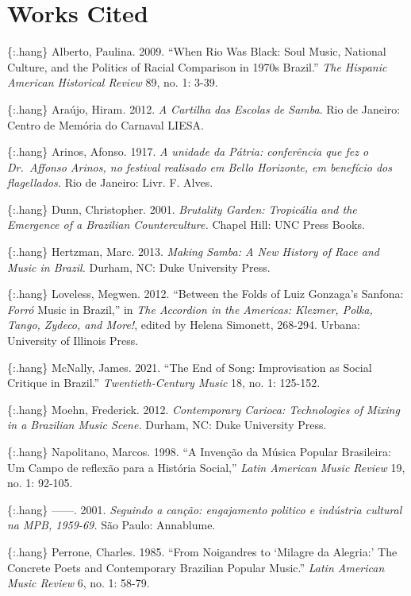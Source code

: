 \documentclass[twoside]{article}
\begin{document}
\hypertarget{works-cited}{%
\section*{Works Cited}\label{works-cited}}

\{:.hang\} Alberto, Paulina. 2009. ``When Rio Was Black: Soul Music,
National Culture, and the Politics of Racial Comparison in 1970s
Brazil.'' \emph{The Hispanic American Historical Review} 89, no. 1:
3-39.

\{:.hang\} Araújo, Hiram\emph{.} 2012. \emph{A Cartilha das Escolas de
Samba}. Rio de Janeiro: Centro de Memória do Carnaval LIESA.

\{:.hang\} Arinos, Afonso. 1917. \emph{A unidade da Pátria: conferência
que fez o Dr.~Affonso Arinos, no festival realisado em Bello Horizonte,
em benefício dos flagellados.} Rio de Janeiro: Livr. F. Alves.

\{:.hang\} Dunn, Christopher. 2001. \emph{Brutality Garden: Tropicália
and the Emergence of a Brazilian Counterculture.} Chapel Hill: UNC Press
Books.

\{:.hang\} Hertzman, Marc. 2013. \emph{Making Samba: A New History of
Race and Music in Brazil.} Durham, NC: Duke University Press.

\{:.hang\} Loveless, Megwen. 2012. ``Between the Folds of Luiz Gonzaga's
Sanfona: \emph{Forró} Music in Brazil,'' in \emph{The Accordion in the
Americas: Klezmer, Polka, Tango, Zydeco, and More!}, edited by Helena
Simonett, 268-294. Urbana: University of Illinois Press.

\{:.hang\} McNally, James. 2021. ``The End of Song: Improvisation as
Social Critique in Brazil.'' \emph{Twentieth-Century Music} 18, no. 1:
125-152.

\{:.hang\} Moehn, Frederick. 2012. \emph{Contemporary Carioca:
Technologies of Mixing in a Brazilian Music Scene.} Durham, NC: Duke
University Press.

\{:.hang\} Napolitano, Marcos. 1998. ``A Invenção da Música Popular
Brasileira: Um Campo de reflexão para a História Social,'' \emph{Latin
American Music Review} 19, no. 1: 92-105.

\{:.hang\} ­­­------. 2001. \emph{Seguindo a canção: engajamento
politico e indústria cultural na MPB, 1959-69.} São Paulo: Annablume.

\{:.hang\} Perrone, Charles. 1985. ``From Noigandres to `Milagre da
Alegria:' The Concrete Poets and Contemporary Brazilian Popular Music.''
\emph{Latin American Music Review} 6, no. 1: 58-79.
\end{document}

